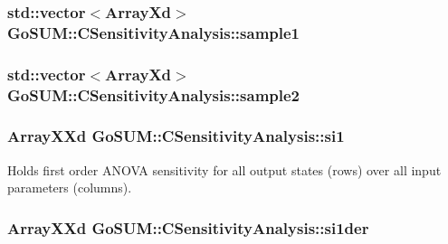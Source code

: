 \hypertarget{class_go_s_u_m_1_1_c_sensitivity_analysis_a4d7c3c0c2f9ff497a3572e3076eab4cd}{
\subsubsection[{sample1}]{\setlength{\rightskip}{0pt plus 5cm}std\-::vector$<$Array\-Xd$>$ Go\-S\-U\-M\-::\-C\-Sensitivity\-Analysis\-::sample1\hspace{0.3cm}{\ttfamily [private]}}}\label{class_go_s_u_m_1_1_c_sensitivity_analysis_a4d7c3c0c2f9ff497a3572e3076eab4cd}
\hypertarget{class_go_s_u_m_1_1_c_sensitivity_analysis_a83eb17d32027d8784cbb15016a0959ea}{
\subsubsection[{sample2}]{\setlength{\rightskip}{0pt plus 5cm}std\-::vector$<$Array\-Xd$>$ Go\-S\-U\-M\-::\-C\-Sensitivity\-Analysis\-::sample2\hspace{0.3cm}{\ttfamily [private]}}}\label{class_go_s_u_m_1_1_c_sensitivity_analysis_a83eb17d32027d8784cbb15016a0959ea}
\hypertarget{class_go_s_u_m_1_1_c_sensitivity_analysis_afa914a5ec4a2686c2a3eed9076c7afe4}{
\subsubsection[{si1}]{\setlength{\rightskip}{0pt plus 5cm}Array\-X\-Xd Go\-S\-U\-M\-::\-C\-Sensitivity\-Analysis\-::si1\hspace{0.3cm}{\ttfamily [private]}}}\label{class_go_s_u_m_1_1_c_sensitivity_analysis_afa914a5ec4a2686c2a3eed9076c7afe4}


Holds first order A\-N\-O\-V\-A sensitivity for all output states (rows) over all input parameters (columns). 

\hypertarget{class_go_s_u_m_1_1_c_sensitivity_analysis_a6f187832e5572a283ab5cf99000f55e3}{
\subsubsection[{si1der}]{\setlength{\rightskip}{0pt plus 5cm}Array\-X\-Xd Go\-S\-U\-M\-::\-C\-Sensitivity\-Analysis\-::si1der\hspace{0.3cm}{\ttfamily [private]}}}\label{class_go_s_u_m_1_1_c_sensitivity_analysis_a6f187832e5572a283ab5cf99000f55e3}


